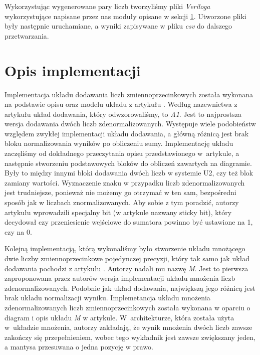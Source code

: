 \documentclass{article}
\begin{document}
Wykorzystując wygenerowane pary liczb tworzyliśmy pliki \emph{Veriloga} wykorzystujące napisane przez nas moduły opisane w sekcji \ref{sec:implementacja}.
Utworzone pliki były następnie uruchamiane, a wyniki zapisywane w pliku \emph{csv} do dalszego przetwarzania.


\section{Opis implementacji}\label{sec:implementacja}
Implementacja układu dodawania liczb zmiennoprzecinkowych została wykonana na podstawie opisu oraz 
modelu układu z artykułu \cite{art:old}.
Według nazewnictwa z artykułu układ dodawania, który odwzorowaliśmy, to \emph{A1}. 
Jest to najprostsza wersja dodawania dwóch liczb zdenormalizowanych.
Występuje wiele podobieństw względem zwykłej implementacji układu dodawania, a główną różnicą jest brak bloku normalizowania wyników po obliczeniu sumy.
Implementację układu zaczęliśmy od dokładnego przeczytania opisu przedstawionego w~artykule, a następnie stworzeniu podstawowych bloków do obliczeń zawartych na diagramie.
Były to między innymi bloki dodawania dwóch liczb w systemie U2, czy też blok zamiany wartości.
Wyznaczenie znaku w przypadku liczb zdenormalizowanych jest trudniejsze, ponieważ nie możemy go otrzymać w ten sam, bezpośredni sposób jak w liczbach znormalizowanych.
Aby sobie z tym poradzić, autorzy artykułu wprowadzili specjalny bit (w artykule \cite{art:old} nazwany sticky bit), który decydował czy przeniesienie wejściowe do sumatora powinno być ustawione na 1, czy na 0.

Kolejną implementacją, którą wykonaliśmy było stworzenie układu mnożącego dwie liczby zmiennoprzecinkowe pojedynczej precyzji, który tak samo jak układ dodawania pochodzi z artykułu \cite{art:old}.
Autorzy nadali mu nazwę \emph{M}.
Jest to pierwsza zaproponowana przez autorów wersja implementacji układu mnożenia liczb zdenormalizowanych.
Podobnie jak układ dodawania, największą jego różnicą jest brak układu normalizacji wyniku.
Implemetancja układu mnożenia zdenormalizowanych liczb zmiennoprzecinkowych została wykonana w oparciu o diagram i opis układu \emph{M} w artykule.
W~architekturze, która została użyta w~układzie mnożenia, autorzy zakładają, że wynik mnożenia dwóch liczb zawsze zakończy się przepełnieniem, wobec tego wykładnik jest zawsze zwiększany jeden, a mantysa przesuwana  o jedna pozycję w prawo.


\end{document}

